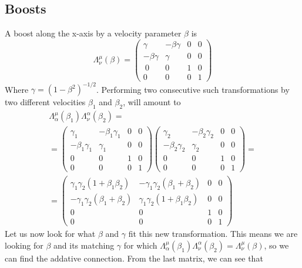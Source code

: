 \documentclass{article}
\begin{document}
\subsection{Boosts}
A boost along the x-axis by a velocity parameter $\beta$ is
\begin{equation}
    \Lambda^\mu_\nu(\beta) = \begin{pmatrix}
        \gamma & -\beta\gamma & 0 & 0 \\
        -\beta\gamma & \gamma & 0 & 0 \\\
        0 & 0 & 1 & 0 \\
        0 & 0 & 0 & 1
    \end{pmatrix}
\end{equation}
Where $\gamma = \left(1-\beta^2\right)^{-1/2}$. Performing two consecutive such transformations by two different velocities $\beta_1$ and $\beta_2$, will amount to
\begin{equation}
\begin{gathered}
    \Lambda^\mu_\alpha(\beta_1) \Lambda^\alpha_\nu(\beta_2) =
    \\
    = \begin{pmatrix}
        \gamma_1 & -\beta_1\gamma_1 & 0 & 0 \\
        -\beta_1\gamma_1 & \gamma_1 & 0 & 0 \\
        0 & 0 & 1 & 0 \\
        0 & 0 & 0 & 1
    \end{pmatrix}
    \begin{pmatrix}
        \gamma_2 & -\beta_2\gamma_2 & 0 & 0 \\
        -\beta_2\gamma_2 & \gamma_2 & 0 & 0 \\
        0 & 0 & 1 & 0 \\
        0 & 0 & 0 & 1
    \end{pmatrix} =
    \\
    = \begin{pmatrix}
        \gamma_1\gamma_2\left(1 + \beta_1\beta_2\right) & -\gamma_1\gamma_2\left(\beta_1 + \beta_2\right) & 0 & 0 \\
        -\gamma_1\gamma_2\left(\beta_1 + \beta_2\right) & \gamma_1\gamma_2\left(1 + \beta_1\beta_2\right) & 0 & 0 \\
        0 & 0 & 1 & 0 \\
        0 & 0 & 0 & 1
    \end{pmatrix}
\end{gathered}
\end{equation}
Let us now look for what $\beta$ and $\gamma$ fit this new transformation. This means we are looking for $\beta$ and its matching $\gamma$ for which $\Lambda^\mu_\alpha(\beta_1)\Lambda^\alpha_\nu(\beta_2) = \Lambda^\mu_\nu(\beta)$, so we can find the addative connection. From the last matrix, we can see that
\end{document}
